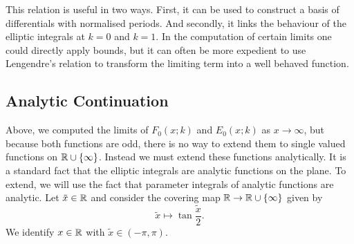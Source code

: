 This relation is useful in two ways. First, it can be used to construct a basis of differentials with normalised periods. And secondly, it links the behaviour of the elliptic integrals at $k=0$ and $k=1$. In the computation of certain limits one could directly apply bounds, but it can often be more expedient to use Lengendre's relation to transform the limiting term into a well behaved function.









\subsection{Analytic Continuation}
\label{sub:EllipticContinuation}


Above, we computed the limits of $F_0(x;k)$ and $E_0(x;k)$ as $x \to \infty$, but because both functions are odd, there is no way to extend them to single valued functions on $\mathbb{R}\cup\{\infty\}$. Instead we must extend these functions analytically. It is a standard fact that the elliptic integrals are analytic functions on the plane. To extend, we will use the fact that parameter integrals of analytic functions are analytic. Let $\tilde{x}\in\mathbb{R}$ and consider the covering map $\mathbb{R} \to \mathbb{R}\cup\{\infty\}$ given by
\[
\tilde{x} \mapsto \tan\frac{\tilde{x}}{2}.
\]
We identify $x\in\mathbb{R}$ with $\tilde{x} \in (-π,π)$.

